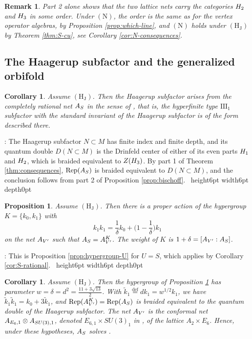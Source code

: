\documentclass[leqno]{article}
\let\cal\relax
\newcommand{\cal}{\mathcal}
\newcommand{\qed}{\hfill \vrule height6pt  width6pt depth0pt}
\newcommand{\ot}{\otimes}
\newcommand{\ov}{\overset}
\DeclareMathOperator{\Rep}{Rep} %
\newtheorem{prop}[thm]{Proposition}
\newtheorem{cor}[thm]{Corollary}
\newtheorem{remark}[thm]{Remark}
\newenvironment{proof}[1][]{\noindent {\it Proof #1} : }{\hbox{~}\qed
\smallskip
}
\numberwithin{equation}{section}
\begin{document}
\begin{remark}\normalfont
Part 2 alone shows that the two lattice nets carry the categories $\cal H_2$ and $\cal H_3$ in some order. Under $\mathrm{(N)}$, the order is the same as for the vertex operator algebras, by Proposition \ref{prop:which-line}, and $\mathrm{(N)}$ holds under $\mathrm{(H_J)}$ by Theorem \ref{thm:S-cu}, see Corollary \ref{cor:N-consequences}.
\end{remark}

\subsection{The Haagerup subfactor and the generalized orbifold}

\begin{cor}
\label{cor:bischoff}
Assume $\mathrm{(H_J)}$. Then the Haagerup subfactor arises from the completely rational net $\cal A_S$ in the sense of \cite[Definition 4.1 p.~20]{Bis17a}, that is, the hyperfinite type $\mathrm{III}_1$ subfactor with the standard invariant of the Haagerup subfactor is of the form described there.
\end{cor}

\begin{proof}
The Haagerup subfactor $N \subset M$ has finite index and finite depth, and its quantum double $D(N \subset M)$ is the Drinfeld center of either of its even parts $\cal H_1$ and $\cal H_2$, which is braided equivalent to $Z(\cal H_3)$. By part 1 of Theorem \ref{thm:consequences}, $\Rep(\cal A_S)$ is braided equivalent to $D(N \subset M)$, and the conclusion follows from part 2 of Proposition \ref{prop:bischoff}.
\end{proof}

\begin{prop}
\label{prop:hypergroup}
Assume $\mathrm{(H_J)}$. Then there is a proper action of the hypergroup $K = \{k_0,k_1\}$ with
\[
k_1k_1 = \frac{1}{\delta}k_0+\Big(1-\frac{1}{\delta}\Big)k_1
\]
on the net $\cal A_{V'}$ such that $\cal A_S = \cal A_{V'}^K$. The weight of $K$ is $1+\delta = [\cal A_{V'} : \cal A_S]$.
\end{prop}

\begin{proof}
This is Proposition \ref{prop:hypergroup-U} for $U = S$, which applies by Corollary \ref{cor:S-rational}.
\end{proof}

\begin{cor}
\label{cor:orbifold}
Assume $\mathrm{(H_J)}$. Then the hypergroup of Proposition \ref{prop:hypergroup} has parameter $w = \delta = d^2 = \frac{11+3\sqrt{13}}{2}$. With $\tilde k_1 \ov{\mathrm{def}}{=} d k_1 = w^{1/2}k_1$, we have $\tilde k_1\tilde k_1 = k_0+3\tilde k_1$, and $\Rep(\cal A_{V'}^K) = \Rep(\cal A_S)$ is braided equivalent to the quantum double of the Haagerup subfactor. The net $\cal A_{V'}$ is the conformal net $\cal A_{E_6,1} \ot \cal A_{SU(3),1}$, denoted $E_{6,1} \times SU(3)_1$ in \cite[Table 1 p.~25]{Bis17b}, of the lattice $A_2 \times E_6$. Hence, under these hypotheses, $\cal A_S$ solves \cite[Problem 4.27 p.~27]{Bis17b}.
\end{cor}
\end{document}
